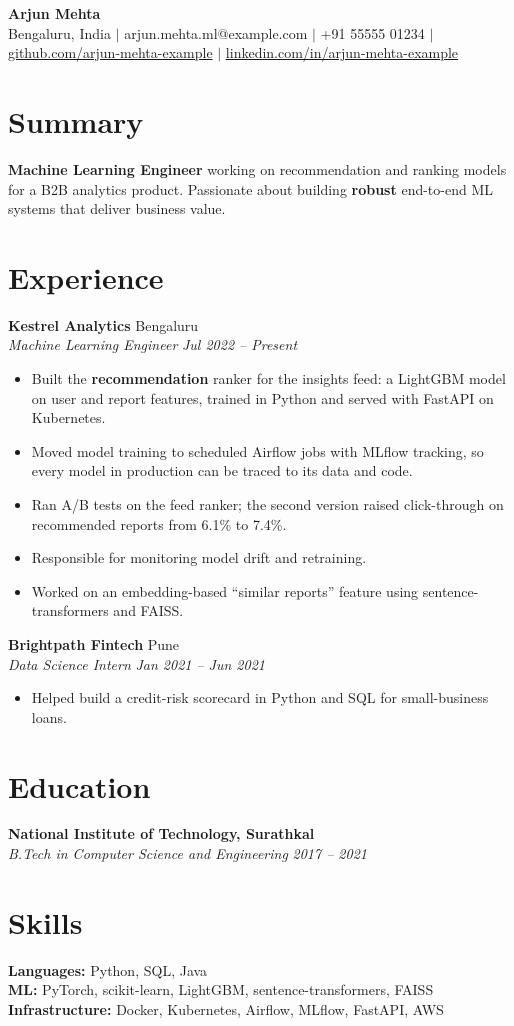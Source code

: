 \documentclass[letterpaper,10pt]{article}
\newcommand{\role}[4]{\textbf{#1} \hfill #2 \\ \textit{#3} \hfill \textit{#4}}
\begin{document}
\begin{center}
{\LARGE \textbf{Arjun Mehta}} \\[3pt]
Bengaluru, India $|$ arjun.mehta.ml@example.com $|$ +91 55555 01234 $|$
\href{https://github.com/arjun-mehta-example}{github.com/arjun-mehta-example} $|$
\href{https://www.linkedin.com/in/arjun-mehta-example}{linkedin.com/in/arjun-mehta-example}
\end{center}

\section{Summary}
\textbf{Machine Learning Engineer} working on recommendation and ranking models for a B2B analytics product. Passionate about building \textbf{robust} end-to-end ML systems that deliver business value.

\section{Experience}
\role{Kestrel Analytics}{Bengaluru}{Machine Learning Engineer}{Jul 2022 -- Present}
\begin{itemize}
  \item Built the \textbf{recommendation} ranker for the insights feed: a LightGBM model on user and report features, trained in Python and served with FastAPI on Kubernetes.
  \item Moved model training to scheduled Airflow jobs with MLflow tracking, so every model in production can be traced to its data and code.
  \item Ran A/B tests on the feed ranker; the second version raised click-through on recommended reports from 6.1\% to 7.4\%.
  \item Responsible for monitoring model drift and retraining.
  \item Worked on an embedding-based ``similar reports'' feature using sentence-transformers and FAISS.
\end{itemize}

\role{Brightpath Fintech}{Pune}{Data Science Intern}{Jan 2021 -- Jun 2021}
\begin{itemize}
  \item Helped build a credit-risk scorecard in Python and SQL for small-business loans.
\end{itemize}

\section{Education}
\role{National Institute of Technology, Surathkal}{}{B.Tech in Computer Science and Engineering}{2017 -- 2021}

\section{Skills}
\textbf{Languages:} Python, SQL, Java \\
\textbf{ML:} PyTorch, scikit-learn, LightGBM, sentence-transformers, FAISS \\
\textbf{Infrastructure:} Docker, Kubernetes, Airflow, MLflow, FastAPI, AWS
\end{document}
